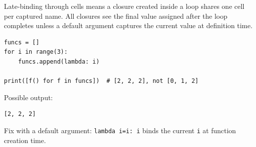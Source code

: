 Late-binding through cells means a closure created inside a loop shares one cell per captured name. All closures see the final value assigned after the loop completes unless a default argument captures the current value at definition time.

\begin{verbatim}
funcs = []
for i in range(3):
    funcs.append(lambda: i)

print([f() for f in funcs])  # [2, 2, 2], not [0, 1, 2]
\end{verbatim}

Possible output:

\begin{verbatim}
[2, 2, 2]
\end{verbatim}

Fix with a default argument: \texttt{lambda i=i: i} binds the current \texttt{i} at function creation time.
